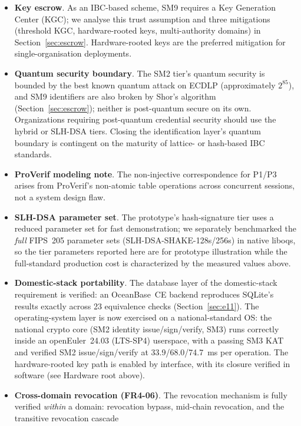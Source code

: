 \documentclass[10pt,twocolumn]{IEEEtran}
\begin{document}
\begin{itemize}
  \item \textbf{Key escrow}. As an IBC-based scheme, SM9 requires a
    Key Generation Center (KGC); we analyse this trust assumption and
    three mitigations (threshold KGC, hardware-rooted keys,
    multi-authority domains) in Section~\ref{sec:escrow}. Hardware-rooted
    keys are the preferred mitigation for single-organisation
    deployments.
  \item \textbf{Quantum security boundary}. The SM2 tier's quantum
    security is bounded by the best known quantum attack on ECDLP
    (approximately $2^{85}$), and SM9 identifiers are also broken by
    Shor's algorithm (Section~\ref{sec:escrow}); neither is
    post-quantum secure on its own. Organizations requiring
    post-quantum credential security should use the hybrid or SLH-DSA
    tiers. Closing the identification layer's quantum boundary is
    contingent on the maturity of lattice- or hash-based IBC
    standards.
  \item \textbf{ProVerif modeling note}. The non-injective
    correspondence for P1/P3 arises from ProVerif's non-atomic table
    operations across concurrent sessions, not a system design flaw.
  \item \textbf{SLH-DSA parameter set}. The prototype's hash-signature
    tier uses a reduced parameter set for fast demonstration; we
    separately benchmarked the \emph{full} FIPS~205 parameter sets
    (SLH-DSA-SHAKE-128s/256s) in native liboqs, so the tier parameters
    reported here are for prototype illustration while the
    full-standard production cost is characterized by the measured
    values above.
  \item \textbf{Domestic-stack portability}. The database layer of the
    domestic-stack requirement is verified: an OceanBase~CE backend
    reproduces SQLite's results exactly across 23 equivalence checks
    (Section~\ref{sec:e11}). The operating-system layer is now
    exercised on a national-standard OS: the national crypto core
    (SM2 identity issue/sign/verify, SM3) runs correctly inside an
    openEuler~24.03 (LTS-SP4) userspace, with a passing SM3 KAT and
    verified SM2 issue/sign/verify at 33.9/68.0/74.7~ms per operation.
    The hardware-rooted key path is enabled by interface, with its
    closure verified in software (see Hardware root above).
  \item \textbf{Cross-domain revocation (FR4-06)}. The revocation
    mechanism is fully verified \emph{within} a domain: revocation
    bypass, mid-chain revocation, and the transitive revocation cascade

\end{itemize}
\end{document}

